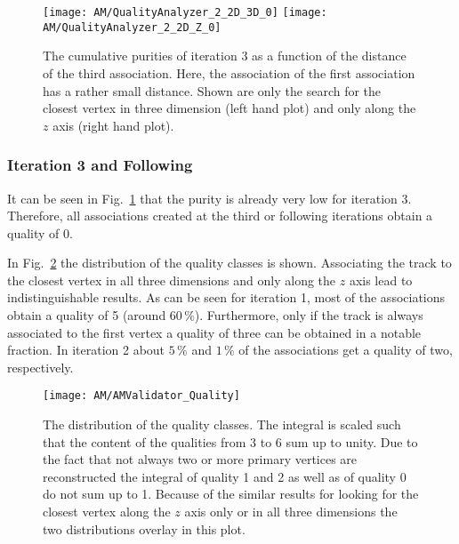 

\begin{figure}[H]
    \centering
    \texttt{[image: AM/QualityAnalyzer\_2\_2D\_3D\_0]}
    \texttt{[image: AM/QualityAnalyzer\_2\_2D\_Z\_0]}
    \caption[Cumulative purities of iteration 3 \vs{} distance between track and primary vertex to define quality for smaller distances of association one]{The cumulative purities of iteration 3 as a function of the distance of the third association. Here, the association of the first association has a rather small distance. Shown are only the search for the closest vertex in three dimension (left hand plot) and only along the $z$ axis (right hand plot).\label{plot:AMWFQualityI30}}
\end{figure}
\clearpage{}

\subsubsection{Iteration 3 and Following}

It can be seen in Fig.~\ref{plot:AMWFQualityI30} that the purity is already very low for iteration 3. Therefore, all associations created at the third or following iterations obtain a quality of 0.

In Fig.~\ref{plot:AMWFQualityDist} the distribution of the quality classes is shown. Associating the track to the closest vertex in all three dimensions and only along the $z$ axis lead to indistinguishable results. As can be seen for iteration 1, most of the associations obtain a quality of 5 (around $60\,\%$). Furthermore, only if the track is always associated to the first vertex a quality of three can be obtained in a notable fraction. In iteration 2 about $5\,\%$ and $1\,\%$ of the associations get a quality of two, respectively.

\begin{figure}[Htb]
    \centering
    \texttt{[image: AM/AMValidator\_Quality]}
    \caption[Distribution of the quality classes]{The distribution of the quality classes. The integral is scaled such that the content of the qualities from 3 to 6 sum up to unity. Due to the fact that not always two or more primary vertices are reconstructed the integral of quality 1 and 2 as well as of quality 0 do not sum up to 1. Because of the similar results for looking for the closest vertex along the $z$ axis only or in all three dimensions the two distributions overlay in this plot. \label{plot:AMWFQualityDist}}
\end{figure}

